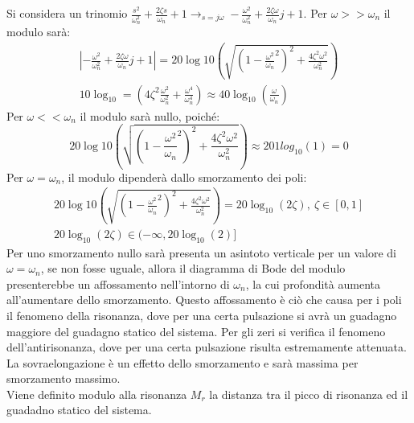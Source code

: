 \documentclass{article}
\numberwithin{equation}{subsection}
\begin{document}
Si considera un trinomio $\displaystyle\frac{s^2}{\omega_n^2}+\frac{2\zeta s}{\omega_n}+1\to_{s=j\omega}-\frac{\omega^2}{\omega_n^2}+\frac{2\zeta\omega}{\omega_n}j+1$. 
Per $\omega>>\omega_n$ il modulo sarà: 
\begin{gather}
    \left|-\frac{\omega^2}{\omega_n^2}+\frac{2\zeta\omega}{\omega_n}j+1\right|=20\log{10}\left(\sqrt{\left(1-\displaystyle\frac{\omega^2}{\omega_n}^2\right)^2+\frac{4\zeta^2\omega^2}{\omega_n^2}}\right)\\
    10\log_{10}=\left(4\zeta^2\displaystyle\frac{\omega^2}{\omega_n^2}+\frac{\omega^4}{\omega_n^4}\right)\approx40\log_{10}\left(\displaystyle\frac{\omega}{\omega_n}\right)
\end{gather}
Per $\omega<<\omega_n$ il modulo sarà nullo, poiché: 
\begin{equation}
    20\log{10}\left(\sqrt{\left(1-\displaystyle\frac{\omega^2}{\omega_n}^2\right)^2+\frac{4\zeta^2\omega^2}{\omega_n^2}}\right)\approx201log_{10}(1)=0
\end{equation}
Per $\omega=\omega_n$, il modulo dipenderà dallo smorzamento dei poli:
\begin{gather}
    20\log{10}\left(\sqrt{\left(1-\displaystyle\frac{\omega^2}{\omega_n}^2\right)^2+\frac{4\zeta^2\omega^2}{\omega_n^2}}\right)=20\log_{10}(2\zeta),\:\zeta\in[0,1]\\
    20\log_{10}(2\zeta)\in(-\infty,20\log_{10}(2)]
\end{gather}
Per uno smorzamento nullo sarà presenta un asintoto verticale per un valore di $\omega=\omega_n$, se non fosse uguale, allora il diagramma di Bode del modulo presenterebbe 
un affossamento nell'intorno di $\omega_n$, la cui profondità aumenta all'aumentare dello smorzamento. Questo affossamento è ciò che causa per i poli il fenomeno della 
risonanza, dove per una certa pulsazione si avrà un guadagno maggiore del guadagno statico del sistema. Per gli zeri si verifica il fenomeno dell'antirisonanza, dove 
per una certa pulsazione risulta estremamente attenuata. La sovraelongazione è un effetto dello smorzamento e sarà massima per smorzamento massimo. \\
Viene definito modulo alla risonanza $M_r$ la distanza tra il picco di risonanza ed il guadadno statico del sistema. 

\begin{center}
\end{center}
\end{document}
